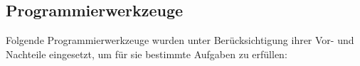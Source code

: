 \documentclass[12pt, oneside, a4paper]{article}		%
\begin{document}


\subsection{Programmierwerkzeuge}

Folgende Programmierwerkzeuge wurden unter Berücksichtigung ihrer Vor- und Nachteile eingesetzt, um für sie bestimmte Aufgaben zu erfüllen:
\end{document}
